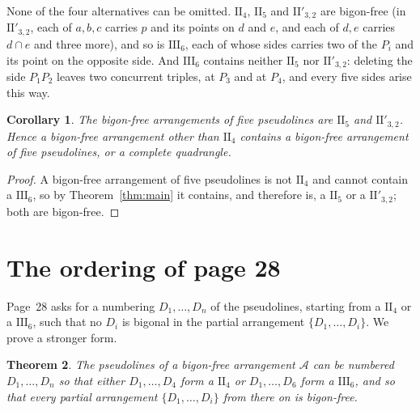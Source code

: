 \documentclass[11pt,a4paper]{amsart}
\newtheorem{theorem}{Theorem}
\newtheorem{corollary}[theorem]{Corollary}
\theoremstyle{definition}
\theoremstyle{remark}
\newcommand{\II}[1]{\mathrm{II}_{#1}}
\newcommand{\IIp}{\mathrm{II}'_{3,2}}
\newcommand{\III}{\mathrm{III}_{6}}
\newcommand{\A}{\mathcal A}
\begin{document}
None of the four alternatives can be omitted. $\II4$, $\II5$ and $\IIp$ are bigon-free (in $\IIp$, each of $a, b, c$ carries $p$ and its points on $d$ and $e$, and each of $d, e$ carries $d \cap e$ and three more), and so is $\III$, each of whose sides carries two of the $P_i$ and its point on the opposite side. And $\III$ contains neither $\II5$ nor $\IIp$: deleting the side $P_1P_2$ leaves two concurrent triples, at $P_3$ and at $P_4$, and every five sides arise this way.

\begin{corollary}\label{cor:five}
The bigon-free arrangements of five pseudolines are $\II5$ and $\IIp$. Hence a bigon-free arrangement other than $\II4$ contains a bigon-free arrangement of five pseudolines, or a complete quadrangle.
\end{corollary}

\begin{proof}
A bigon-free arrangement of five pseudolines is not $\II4$ and cannot contain a $\III$, so by Theorem~\ref{thm:main} it contains, and therefore is, a $\II5$ or a $\IIp$; both are bigon-free.
\end{proof}

\section{The ordering of page 28}

Page~28 asks for a numbering $D_1, \dots, D_n$ of the pseudolines, starting from a $\II4$ or a $\III$, such that no $D_i$ is bigonal in the partial arrangement $\{D_1, \dots, D_i\}$. We prove a stronger form.

\begin{theorem}\label{thm:order}
The pseudolines of a bigon-free arrangement $\A$ can be numbered $D_1, \dots, D_n$ so that either $D_1, \dots, D_4$ form a $\II4$ or $D_1, \dots, D_6$ form a $\III$, and so that every partial arrangement $\{D_1, \dots, D_i\}$ from there on is bigon-free.
\end{theorem}
\end{document}
